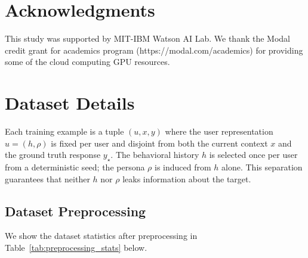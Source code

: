 \documentclass[11pt]{article}
\begin{document}

\section*{Acknowledgments}
This study was supported by MIT-IBM Watson AI Lab. We thank the Modal credit grant for academics program (https://modal.com/academics) for providing some of the cloud computing GPU resources.


\clearpage

\appendix

\section{Dataset Details}
\label{app:dataset-stats}

Each training example is a tuple $(u, x, y)$ where the user representation $u = (h, \rho)$ is fixed per user and disjoint from both the current context $x$ and the ground truth response $y_{\star}$. The behavioral history $h$ is selected once per user from a deterministic seed; the persona $\rho$ is induced from $h$ alone. This separation guarantees that neither $h$ nor $\rho$ leaks information about the target.

\subsection{Dataset Preprocessing}

We show the dataset statistics after preprocessing in Table~\ref{tab:preprocessing_stats} below.
\end{document}
